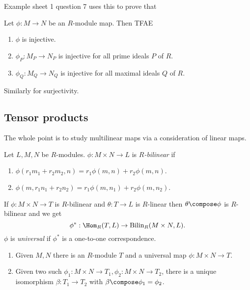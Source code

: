 \documentclass[a4paper]{article}
\begin{document}
Example sheet 1 question 7 uses this to prove that

\begin{proposition}
    Let \(\phi: M \to N\) be an \(R\)-module map. Then TFAE
    \begin{enumerate}
    \item \(\phi\) is injective.
    \item \(\phi_P: M_P \to N_P\) is injective for all prime ideals \(P\) of \(R\).
    \item \(\phi_Q: M_Q \to N_Q\) is injective for all maximal ideals \(Q\) of \(R\).
    \end{enumerate}
\end{proposition}
Similarly for surjectivity.

\subsection{Tensor products}

The whole point is to study multilinear maps via a consideration of linear maps.

\begin{definition}
  Let \(L, M, N\) be \(R\)-modules. \(\phi: M \times N \to L\) is \emph{\(R\)-bilinear} if
  \begin{enumerate}
  \item \(\phi(r_1m_1 + r_2m_2, n) = r_1 \phi(m, n) + r_2 \phi(m, n)\).
  \item \(\phi(m, r_1n_1 + r_2n_2) = r_1 \phi(m, n_1) + r_2 \phi(m, n_2)\).
  \end{enumerate}
\end{definition}

If \(\phi: M \times N \to T\) is \(R\)-bilinear and \(\theta: T \to L\) is \(R\)-linear then \(\theta \compose \phi\) is \(R\)-bilinear and we get
\[
  \phi^*: \Hom_R(T, L) \to \text{Bilin}_R(M \times N, L).
\]
\(\phi\) is \emph{universal} if \(\phi^*\) is a one-to-one correspondence.

\begin{lemma}\leavevmode
  \begin{enumerate}
  \item Given \(M, N\) there is an \(R\)-module \(T\) and a universal map \(\phi: M \times N \to T\).
  \item Given two such \(\phi_1: M \times N \to T_1, \phi_2: M \times N \to T_2\), there is a unique isomorphism \(\beta: T_1 \to T_2\) with \(\beta \compose \phi_1 = \phi_2\).
  \end{enumerate}
\end{lemma}
\end{document}
